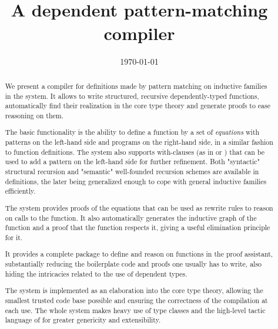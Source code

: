 \documentclass{llncs}
\author{\theauthor}
\date{\today}
\institute{\myaffiliation
  \\\email{\mymail}}
\title{\Equations\\
  A dependent pattern-matching compiler}
\begin{document}
\maketitle

\begin{abstract}
  We present a compiler for definitions made by pattern matching on
  inductive families in the \Coq system. It allows to write structured,
  recursive dependently-typed functions, automatically find their
  realization in the core type theory and generate proofs to ease
  reasoning on them.
  
  The basic functionality is the ability to define a function by a set
  of \textit{equations} with patterns on the left-hand side and programs
  on the right-hand side, in a similar fashion to \Haskell
  function definitions. The system also supports with-clauses (as in
  \Epigram or \Agda) that can be used to add a pattern on the left-hand
  side for further refinement. Both "syntactic" structural recursion and
  "semantic" well-founded recursion schemes are available in definitions,
  the later being generalized enough to cope with general inductive
  families efficiently.
  
  The system provides proofs of the equations that can be used as
  rewrite rules to reason on calls to the function. It also
  automatically generates the inductive graph of the function and a
  proof that the function respects it, giving a useful elimination
  principle for it.

  It provides a complete package to define 
  and reason on functions in the proof assistant, substantially
  reducing the boilerplate code and proofs one usually has to write, 
  also hiding the intricacies related to the use of dependent types.
  
  The system is implemented as an elaboration into the core \Coq type
  theory, allowing the smallest trusted code base possible and ensuring 
  the correctness of the compilation at each use.
  The whole system makes heavy use of type classes and the high-level
  tactic language of \Coq for greater genericity and extensibility.
\end{abstract}







\end{document}
